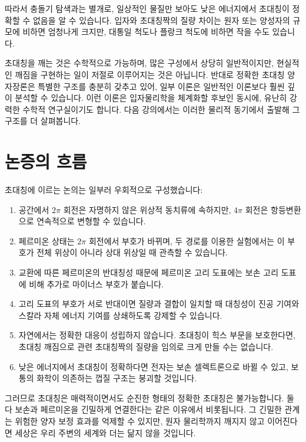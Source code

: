 따라서 충돌기 탐색과는 별개로, 일상적인 물질만 보아도 낮은 에너지에서 초대칭이 정확할 수 없음을 알 수 있습니다. 입자와 초대칭짝의 질량 차이는 원자 또는 양성자의 규모에 비하면 엄청나게 크지만, 대통일 척도나 플랑크 척도에 비하면 작을 수도 있습니다.

\begin{classroomqa}
\end{classroomqa}

초대칭을 깨는 것은 수학적으로 가능하며, 많은 구성에서 상당히 일반적이지만, 현실적인 깨짐을 구현하는 일이 저절로 이루어지는 것은 아닙니다. 반대로 정확한 초대칭 양자장론은 특별한 구조를 충분히 갖추고 있어, 일부 이론은 일반적인 이론보다 훨씬 깊이 분석할 수 있습니다. 이런 이론은 입자물리학을 체계화할 후보인 동시에, 유난히 강력한 수학적 연구실이기도 합니다. 다음 강의에서는 이러한 물리적 동기에서 출발해 그 구조를 더 살펴봅니다.

\section{논증의 흐름}

초대칭에 이르는 논의는 일부러 우회적으로 구성했습니다:
\begin{enumerate}
\item 공간에서 \(2\pi\) 회전은 자명하지 않은 위상적 동치류에 속하지만, \(4\pi\) 회전은 항등변환으로 연속적으로 변형할 수 있습니다.
\item 페르미온 상태는 \(2\pi\) 회전에서 부호가 바뀌며, 두 경로를 이용한 실험에서는 이 부호가 전체 위상이 아니라 상대 위상일 때 관측할 수 있습니다.
\item 교환에 따른 페르미온의 반대칭성 때문에 페르미온 고리 도표에는 보손 고리 도표에 비해 추가로 마이너스 부호가 붙습니다.
\item 고리 도표의 부호가 서로 반대이면 질량과 결합이 일치할 때 대칭성이 진공 기여와 스칼라 자체 에너지 기여를 상쇄하도록 강제할 수 있습니다.
\item 자연에서는 정확한 대응이 성립하지 않습니다. 초대칭이 힉스 부문을 보호한다면, 초대칭 깨짐으로 관련 초대칭짝의 질량을 임의로 크게 만들 수는 없습니다.
\item 낮은 에너지에서 초대칭이 정확하다면 전자는 보손 셀렉트론으로 바뀔 수 있고, 보통의 화학이 의존하는 껍질 구조는 붕괴할 것입니다.
\end{enumerate}

그러므로 초대칭은 매력적이면서도 순진한 형태의 정확한 초대칭은 불가능합니다. 둘 다 보손과 페르미온을 긴밀하게 연결한다는 같은 이유에서 비롯됩니다. 그 긴밀한 관계는 위험한 양자 보정 효과를 억제할 수 있지만, 원자 물리학까지 깨지지 않고 이어진다면 세상은 우리 주변의 세계와 더는 닮지 않을 것입니다.